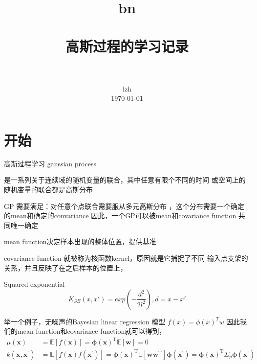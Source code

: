 \documentclass[a4paper, 12pt, CJKnumber, UTF8, openany,nofonts, fancyhdr]{ctexbook}
\title{
        \usefont{OT1}{bch} {b}{n}
        \normalfont \normalsize \textsc{} \\ [25pt]
        \horrule{1.5pt} \\[0.4cm]
        \huge 高斯过程的学习记录\\
        \horrule{1.5pt} \\[0.5cm]
}
\author {
        \normalfont                                 \normalsize
        lzh\\[-2pt]      \normalsize
        \today
}
\date{}
\begin{document}
\linespread{1.69}\selectfont
\maketitle
\eject
\tableofcontents
\eject

\frontmatter %
\linespread{1.4}


\selectfont
\renewcommand*{\contentsname}{目\qquad 录}
\renewcommand*\listfigurename{\textbf{插\ 图\ 目\ 录}}
\renewcommand*\listtablename{\textbf{表\ 格\ 目\ 录}}
\renewcommand*\bibname{\textbf{参\ 考\ 文\ 献}}

\mainmatter %
\linespread{1.5}\selectfont
\setlength{\topskip}{0mm}
\newcommand{\upcite}[1]{\textsuperscript{\textsuperscript{\cite{#1}}}}

\section{开始}
高斯过程学习
gaussian process

是一系列关于连续域的随机变量的联合，其中任意有限个不同的时间
或空间上的随机变量的联合都是高斯分布

GP 需要满足：对任意个点联合需要服从多元高斯分布
，这个分布需要一个确定的mean和确定的convariance
因此，一个GP可以被mean和covariance function 共同唯一确定

mean function决定样本出现的整体位置，提供基准

covariance function 就被称为核函数kernel，原因就是它捕捉了不同
输入点支架的关系，并且反映了在之后样本的位置上，

Squared exponential 
\begin{equation}
K_{SE}(x,x') = exp(-\frac{d^2}{2l^2}), d = x-x'
\end{equation}

举一个例子，无噪声的Bayesian linear regression 模型
$f(x) =\phi(x)^Tw$ 因此我们的mean function和covariance function就可以得到，
\begin{equation}
  \begin{aligned} \mu(\boldsymbol{x}) &=\mathbb{E}[f(\boldsymbol{x})]=\boldsymbol{\phi}(\boldsymbol{x})^{\mathrm{T}} \mathbb{E}[\boldsymbol{w}]=0 \\ k\left(\boldsymbol{x}, \boldsymbol{x}^{\prime}\right) &=\mathbb{E}\left[f(\boldsymbol{x}) f\left(\boldsymbol{x}^{\prime}\right)\right]=\boldsymbol{\phi}(\boldsymbol{x})^{\mathrm{T}} \mathbb{E}\left[\boldsymbol{w} \boldsymbol{w}^{\mathrm{T}}\right] \boldsymbol{\phi}\left(\boldsymbol{x}^{\prime}\right)=\boldsymbol{\phi}(\boldsymbol{x})^{\mathrm{T}} \Sigma_{p} \boldsymbol{\phi}\left(\boldsymbol{x}^{\prime}\right) \end{aligned}
\end{equation}
\end{document}
